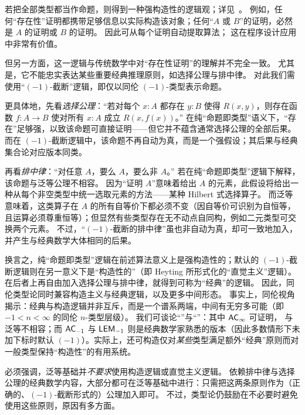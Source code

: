 若把全部类型都当作命题，则得到一种强构造性的逻辑观；详见~\cite{kolmogorov,TroelstraI,TroelstraII}。
例如，任何“存在性”证明都携带足够信息以实际构造该对象；任何“$A$ 或 $B$”的证明，必然是 $A$ 的证明或 $B$ 的证明。
因此可从每个证明自动提取算法； 这在程序设计应用中非常有价值。

但另一方面，这一逻辑与传统数学中对“存在性证明”的理解并不完全一致。
尤其是，它不能忠实表达某些重要经典推理原则，如选择公理与排中律。
对此我们需使用“$(-1)$-截断”逻辑，即仅以同伦 $(-1)$-类型表示命题。

%
更具体地，先看\emph{选择公理}：“若对每个 $x:A$ 都存在 $y:B$ 使得 $R(x,y)$，则存在函数 $f : A\to B$ 使对所有 $x:A$ 成立 $R(x,f(x))$。”
在纯“命题即类型”语义下，“存在”足够强，以致该命题可直接证明——但它并不蕴含通常选择公理的全部后果。
而在 $(-1)$-截断逻辑中，该命题不再自动为真，而是一个强假设；其后果与经典集合论对应版本同类。

%
%
再看\emph{排中律}：“对任意 $A$，要么 $A$，要么非 $A$。”
若在纯“命题即类型”逻辑下解释，该命题与泛等公理不相容。
因为“证明 $A$”意味着给出 $A$ 的元素，此假设将给出一种从每个非空类型中统一选取元素的方法——某种 Hilbert 式选择算子。
而泛等意味着，这类算子在 $A$ 的所有自等价下都必须不变（因自等价可识别为自恒等，且运算必须尊重恒等）；但显然有些类型存在无不动点自同构，例如二元类型可交换两个元素。
%
不过，“$(-1)$-截断的排中律”虽也非自动为真，却可一致地加入，并产生与经典数学大体相同的后果。

换言之，纯“命题即类型”逻辑在前述算法意义上是强构造性的；默认的 $(-1)$-截断逻辑则在另一意义下是“构造性的”（即 Heyting 所形式化的“直觉主义”逻辑）。在后者上再自由加入选择公理与排中律，就得到可称为“经典”的逻辑。
因此，同伦类型论同时兼容构造主义与经典逻辑，以及更多中间形态。
%
事实上，同伦视角揭示：经典与构造逻辑并非互斥，而是一个谱系两端，中间有无穷多可能（即 $-1 < n < \infty$ 的同伦 $n$-类型层级）。
我们可谈论“”与“”：其中 $\mathsf{AC}_{\infty}$ 可证明，\LEM{\infty} 与泛等不相容；而 $\mathsf{AC}_{-1}$ 与 $\mathsf{LEM}_{-1}$ 则是经典数学家熟悉的版本（因此多数情形下未加下标时默认 $(-1)$）。实际上，还可构造仅对\emph{某些}类型满足额外“经典”原则而对一般类型保持“构造性”的有用系统。%

必须强调，泛等基础并\emph{不要求}使用构造逻辑或直觉主义逻辑。%
依赖排中律与选择公理的经典数学内容，大部分都可在泛等基础中进行：只需把这两条原则作为（正确的、$(-1)$-截断形式的）公理加入即可。
不过，类型论仍鼓励在不必要时避免使用这些原则，原因有多方面。

